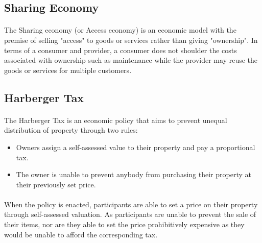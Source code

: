\subsection{Sharing Economy} \label{section:sharingeconomy}

\paragraph{} The Sharing economy (or Access economy) is an economic model with the premise of selling "access" to goods or services rather than giving "ownership". In terms of a consumer and provider, a consumer does not shoulder the costs associated with ownership such as maintenance while the provider may reuse the goods or services for multiple customers. 

\subsection{Harberger Tax} \label{section:harbergerstax}


\paragraph{} The Harberger Tax is an economic policy that aims to prevent unequal distribution of property through two rules:

\begin{itemize}
  \item Owners assign a self-assessed value to their property and pay a proportional tax. 
  \item The owner is unable to prevent anybody from purchasing their property at their previously set price.
\end{itemize}


\paragraph{} When the policy is enacted, participants are able to set a price on their property through self-assessed valuation. As participants are unable to prevent the sale of their items, nor are they able to set the price prohibitively expensive as they would be unable to afford the corresponding tax. 

